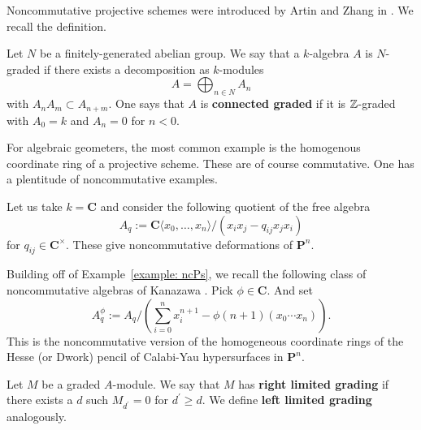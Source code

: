 \documentclass[dissertation.tex]{subfiles}
\begin{document}
Noncommutative projective schemes were introduced by Artin and Zhang in \cite{AZ}. We recall the definition.

\begin{definition}
  Let \(N\) be a finitely-generated abelian group. We say that a \(k\)-algebra \(A\) is \(N\)-graded if there exists a decomposition as \(k\)-modules 
  \begin{displaymath}
    A = \bigoplus_{n \in N} A_n
  \end{displaymath}
  with \(A_n A_m \subset A_{n+m}\). One says that \(A\) is \textbf{connected graded} if it is \(\mathbb{Z}\)-graded with \(A_0 = k\) and \(A_n = 0\) for \(n < 0\). 
\end{definition}

For algebraic geometers, the most common example is the homogenous coordinate ring of a projective scheme. These are of course commutative. One has a plentitude of noncommutative examples. 

\begin{example} \label{example: ncPs}
  Let us take \(k = \mathbf{C}\) and consider the following quotient of the free algebra 
  \begin{displaymath}
    A_q := \mathbf{C}\langle x_0,\ldots,x_n \rangle/(x_i x_j - q_{ij} x_j x_i)
  \end{displaymath}
  for \(q_{ij} \in \mathbf{C}^\times\). These give noncommutative deformations of \(\mathbf{P}^n\).
\end{example}

\begin{example} \label{example: ncCY}
  Building off of Example~\ref{example: ncPs}, we recall the following class of noncommutative algebras of Kanazawa \cite{Kana}. Pick \(\phi \in \mathbf{C}\). And set 
  \begin{displaymath}
    A^\phi_q := A_q / \left( \sum_{i = 0}^n x_i^{n+1} - \phi(n+1)(x_0\cdots x_n) \right). 
  \end{displaymath}
  This is the noncommutative version of the homogeneous coordinate rings of the Hesse (or Dwork) pencil of Calabi-Yau hypersurfaces in \(\mathbf{P}^n\). 
\end{example}


\begin{definition}
  Let \(M\) be a graded \(A\)-module. We say that \(M\) has \textbf{right limited grading} if there exists a \(d\) such \(M_{d^\prime} = 0\) for \(d^\prime \geq d\). We define \textbf{left limited grading} analogously.
\end{definition}
\end{document}
